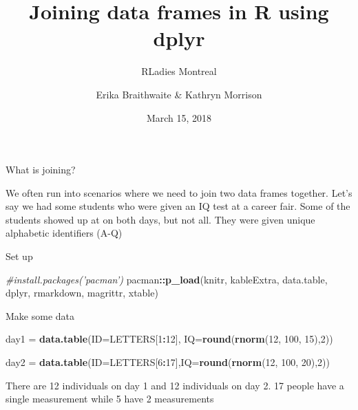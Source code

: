 \documentclass[ignorenonframetext,]{beamer}
\title{Joining data frames in R using dplyr}
\subtitle{RLadies Montreal}
\author{Erika Braithwaite \& Kathryn Morrison}
\date{March 15, 2018}
\newenvironment{Shaded}{\begin{snugshade}}{\end{snugshade}}
\newcommand{\KeywordTok}[1]{\textcolor[rgb]{0.13,0.29,0.53}{\textbf{#1}}}
\newcommand{\DataTypeTok}[1]{\textcolor[rgb]{0.13,0.29,0.53}{#1}}
\newcommand{\DecValTok}[1]{\textcolor[rgb]{0.00,0.00,0.81}{#1}}
\newcommand{\StringTok}[1]{\textcolor[rgb]{0.31,0.60,0.02}{#1}}
\newcommand{\CommentTok}[1]{\textcolor[rgb]{0.56,0.35,0.01}{\textit{#1}}}
\newcommand{\OperatorTok}[1]{\textcolor[rgb]{0.81,0.36,0.00}{\textbf{#1}}}
\newcommand{\NormalTok}[1]{#1}
\begin{document}
\frame{\titlepage}

\begin{frame}[fragile]{What is joining?}

We often run into scenarios where we need to join two data frames
together. Let's say we had some students who were given an IQ test at a
career fair. Some of the students showed up at on both days, but not
all. They were given unique alphabetic identifiers (A-Q)

Set up

\begin{Shaded}
\begin{Highlighting}[]
\CommentTok{#install.packages('pacman')}
\NormalTok{pacman}\OperatorTok{::}\KeywordTok{p_load}\NormalTok{(knitr, kableExtra, data.table, dplyr, }
\NormalTok{               rmarkdown, magrittr, xtable)}
\end{Highlighting}
\end{Shaded}

Make some data

\begin{Shaded}
\begin{Highlighting}[]
\NormalTok{day1 =}\StringTok{  }\KeywordTok{data.table}\NormalTok{(}\DataTypeTok{ID=}\NormalTok{LETTERS[}\DecValTok{1}\OperatorTok{:}\DecValTok{12}\NormalTok{], }\DataTypeTok{IQ=}\KeywordTok{round}\NormalTok{(}\KeywordTok{rnorm}\NormalTok{(}\DecValTok{12}\NormalTok{, }\DecValTok{100}\NormalTok{, }\DecValTok{15}\NormalTok{),}\DecValTok{2}\NormalTok{))}

\NormalTok{day2 =}\StringTok{  }\KeywordTok{data.table}\NormalTok{(}\DataTypeTok{ID=}\NormalTok{LETTERS[}\DecValTok{6}\OperatorTok{:}\DecValTok{17}\NormalTok{],}\DataTypeTok{IQ=}\KeywordTok{round}\NormalTok{(}\KeywordTok{rnorm}\NormalTok{(}\DecValTok{12}\NormalTok{, }\DecValTok{100}\NormalTok{, }\DecValTok{20}\NormalTok{),}\DecValTok{2}\NormalTok{))}
\end{Highlighting}
\end{Shaded}

There are 12 individuals on day 1 and 12 individuals on day 2. 17 people
have a single measurement while 5 have 2 measurements

\end{frame}
\end{document}
